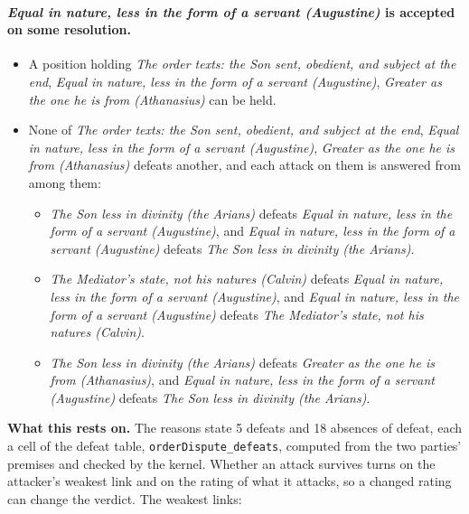 \documentclass[11pt,paper=\testimonypaper,DIV=13,parskip=false]{scrartcl}
\begin{document}
\paragraph{\emph{Equal in nature, less in the form of a servant (Augustine)} is accepted on some resolution.}
\begin{itemize}
\item A position holding \emph{The order texts: the Son sent, obedient, and subject at the end}, \emph{Equal in nature, less in the form of a servant (Augustine)}, \emph{Greater as the one he is from (Athanasius)} can be held.
\item None of \emph{The order texts: the Son sent, obedient, and subject at the end}, \emph{Equal in nature, less in the form of a servant (Augustine)}, \emph{Greater as the one he is from (Athanasius)} defeats another, and each attack on them is answered from among them:
\begin{itemize}
\item \emph{The Son less in divinity (the Arians)} defeats \emph{Equal in nature, less in the form of a servant (Augustine)}, and \emph{Equal in nature, less in the form of a servant (Augustine)} defeats \emph{The Son less in divinity (the Arians)}.
\item \emph{The Mediator’s state, not his natures (Calvin)} defeats \emph{Equal in nature, less in the form of a servant (Augustine)}, and \emph{Equal in nature, less in the form of a servant (Augustine)} defeats \emph{The Mediator’s state, not his natures (Calvin)}.
\item \emph{The Son less in divinity (the Arians)} defeats \emph{Greater as the one he is from (Athanasius)}, and \emph{Equal in nature, less in the form of a servant (Augustine)} defeats \emph{The Son less in divinity (the Arians)}.
\end{itemize}
\end{itemize}
\par\noindent\textbf{What this rests on.} The reasons state 5 defeats and 18 absences of defeat, each a cell of the defeat table, \texttt{order\allowbreak{}Dispute\_\allowbreak{}defeats}, computed from the two parties' premises and checked by the kernel. Whether an attack survives turns on the attacker's weakest link and on the rating of what it attacks, so a changed rating can change the verdict. The weakest links:
\end{document}
